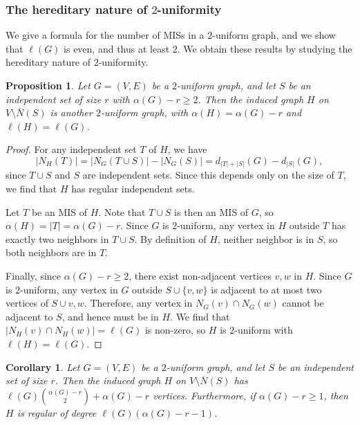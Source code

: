 \documentclass{article}
\theoremstyle{plain}
\theoremstyle{remark}
\theoremstyle{plain}
\newtheorem{corollary}[theorem]{Corollary}
\newtheorem{proposition}[theorem]{Proposition}
\numberwithin{equation}{section}
\begin{document}
	\subsubsection{The hereditary nature of $2$-uniformity}\label{subsection_independent_hereditary}
	
	We give a formula for the number of MISs in a $2$-uniform graph, and we show that $\ell(G)$ is even, and thus at least $2$. We obtain these results by studying the hereditary nature of $2$-uniformity.
	
	\begin{proposition}\label{proposition_hereditary}
		Let $G=(V,E)$ be a $2$-uniform graph, and let $S$ be an independent set of size $r$ with $\alpha(G)-r\geq2$. Then the induced graph $H$ on $V\setminus\overline{N}(S)$ is another $2$-uniform graph, with $\alpha(H)=\alpha(G)-r$ and $\ell(H)=\ell(G)$.
	\end{proposition}
	
	\begin{proof}
		For any independent set $T$ of $H$, we have $$|N_H(T)|=|N_G(T\cup S)|-|N_G(S)|=d_{|T|+|S|}(G)-d_{|S|}(G),$$ since $T\cup S$ and $S$ are independent sets. Since this depends only on the size of $T$, we find that $H$ has regular independent sets.
		
		Let $T$ be an MIS of $H$. Note that $T\cup S$ is then an MIS of $G$, so $\alpha(H)=|T|=\alpha(G)-r$. Since $G$ is $2$-uniform, any vertex in $H$ outside $T$ has exactly two neighbors in $T\cup S$. By definition of $H$, neither neighbor is in $S$, so both neighbors are in $T$.
		
		Finally, since $\alpha(G)-r\geq2$, there exist non-adjacent vertices $v,w$ in $H$. Since $G$ is $2$-uniform, any vertex in $G$ outside $S\cup\{v,w\}$ is adjacent to at most two vertices of $S\cup{v,w}$. Therefore, any vertex in $N_G(v)\cap N_G(w)$ cannot be adjacent to $S$, and hence must be in $H$. We find that $|N_H(v)\cap N_H(w)|=\ell(G)$ is non-zero, so $H$ is $2$-uniform with $\ell(H)=\ell(G)$.
	\end{proof}
	
	\begin{corollary}\label{corollary_hereditary}
		Let $G=(V,E)$ be a $2$-uniform graph, and let $S$ be an independent set of size $r$. Then the induced graph $H$ on $V\setminus\overline{N}(S)$ has $\ell(G)\binom{\alpha(G)-r}{2}+\alpha(G)-r$ vertices. Furthermore, if $\alpha(G)-r\geq1$, then $H$ is regular of degree $\ell(G)(\alpha(G)-r-1)$.
	\end{corollary}
	
\end{document}
